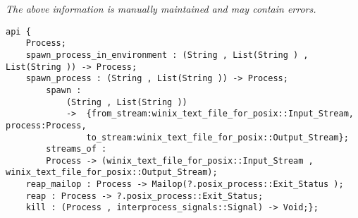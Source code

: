 \label{api:Spawn}

{\tiny \it The above information is manually maintained and may contain errors.}
\begin{verbatim}
api {
    Process;
    spawn_process_in_environment : (String , List(String ) , List(String )) -> Process;
    spawn_process : (String , List(String )) -> Process;
        spawn :
            (String , List(String ))
            ->  {from_stream:winix_text_file_for_posix::Input_Stream, process:Process,
                to_stream:winix_text_file_for_posix::Output_Stream};
        streams_of :
        Process -> (winix_text_file_for_posix::Input_Stream , winix_text_file_for_posix::Output_Stream);
    reap_mailop : Process -> Mailop(?.posix_process::Exit_Status );
    reap : Process -> ?.posix_process::Exit_Status;
    kill : (Process , interprocess_signals::Signal) -> Void;};
\end{verbatim}
